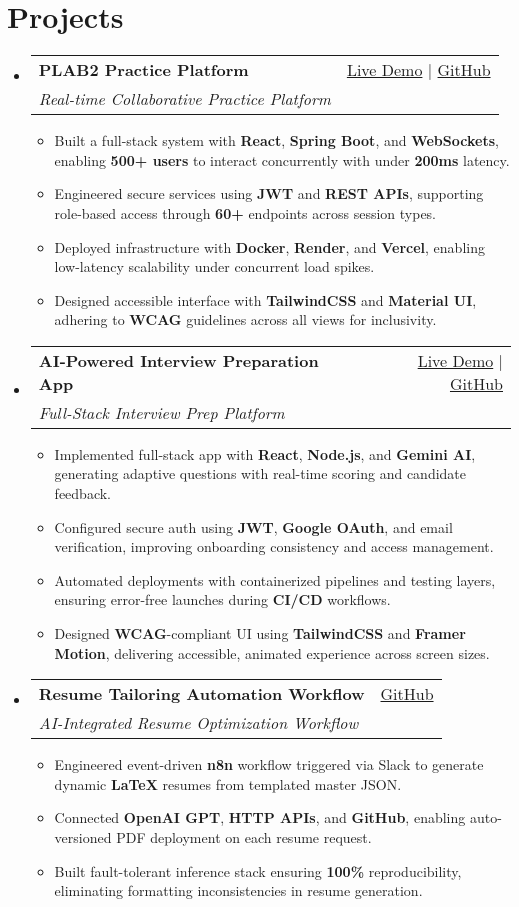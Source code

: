 \documentclass[letterpaper,10pt]{article}
\makeatletter
\newcommand{\resumeItem}[1]{\item\small{#1 \vspace{-2pt}}}
\newcommand{\resumeSubheading}[4]{
  \vspace{-1pt}\item
    \begin{tabular*}{0.97\textwidth}[t]{l@{\extracolsep{\fill}}r}
      \textbf{#1} & #2 \\
      \textit{\small#3} & \textit{\small #4} \\
    \end{tabular*}\vspace{-5pt}
}
\newcommand{\resumeSubHeadingListStart}{\begin{itemize}[leftmargin=*]}
\newcommand{\resumeSubHeadingListEnd}{\end{itemize}}
\newcommand{\resumeItemListStart}{\begin{itemize}}
\newcommand{\resumeItemListEnd}{\end{itemize}\vspace{-5pt}}
\makeatother
\begin{document}
\section{Projects}
  \resumeSubHeadingListStart
    \resumeSubheading
      {\textbf{PLAB2 Practice Platform}}{\href{https://plab2practice.com}{Live Demo} | \href{https://github.com/altansaid/plab2projectnew}{GitHub}}
      {Real-time Collaborative Practice Platform}{}
      \resumeItemListStart
        \resumeItem{Built a full-stack system with \textbf{React}, \textbf{Spring Boot}, and \textbf{WebSockets}, enabling \textbf{500+ users} to interact concurrently with under \textbf{200ms} latency.}
        \resumeItem{Engineered secure services using \textbf{JWT} and \textbf{REST APIs}, supporting role-based access through \textbf{60+} endpoints across session types.}
        \resumeItem{Deployed infrastructure with \textbf{Docker}, \textbf{Render}, and \textbf{Vercel}, enabling low-latency scalability under concurrent load spikes.}
        \resumeItem{Designed accessible interface with \textbf{TailwindCSS} and \textbf{Material UI}, adhering to \textbf{WCAG} guidelines across all views for inclusivity.}
      \resumeItemListEnd

    \resumeSubheading
      {\textbf{AI-Powered Interview Preparation App}}{\href{https://interviewcoach-ai.vercel.app}{Live Demo} | \href{https://github.com/altansaid/interviewcoach-ai}{GitHub}}
      {Full-Stack Interview Prep Platform}{}
      \resumeItemListStart
        \resumeItem{Implemented full-stack app with \textbf{React}, \textbf{Node.js}, and \textbf{Gemini AI}, generating adaptive questions with real-time scoring and candidate feedback.}
        \resumeItem{Configured secure auth using \textbf{JWT}, \textbf{Google OAuth}, and email verification, improving onboarding consistency and access management.}
        \resumeItem{Automated deployments with containerized pipelines and testing layers, ensuring error-free launches during \textbf{CI/CD} workflows.}
        \resumeItem{Designed \textbf{WCAG}-compliant UI using \textbf{TailwindCSS} and \textbf{Framer Motion}, delivering accessible, animated experience across screen sizes.}
      \resumeItemListEnd

    \resumeSubheading
      {\textbf{Resume Tailoring Automation Workflow}}{\href{https://github.com/altansaid/resume-updates}{GitHub}}
      {AI-Integrated Resume Optimization Workflow}{}
      \resumeItemListStart
        \resumeItem{Engineered event-driven \textbf{n8n} workflow triggered via Slack to generate dynamic \textbf{LaTeX} resumes from templated master JSON.}
        \resumeItem{Connected \textbf{OpenAI GPT}, \textbf{HTTP APIs}, and \textbf{GitHub}, enabling auto-versioned PDF deployment on each resume request.}
        \resumeItem{Built fault-tolerant inference stack ensuring \textbf{100\%} reproducibility, eliminating formatting inconsistencies in resume generation.}
      \resumeItemListEnd
  \resumeSubHeadingListEnd
\end{document}
